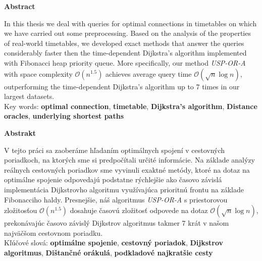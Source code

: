 \documentclass[a4paper]{article}
\renewenvironment{abstract}[1]
{
	\Large
	\begin{center}
		\textbf{#1}
	\end{center}
	
	\normalsize
	
	\addtolength{\leftskip}{1in}
	\addtolength{\rightskip}{1in}
	\setlength{\parindent}{0in}
}
{
}
\numberwithin{algorithm}{section}
\numberwithin{figure}{section}
\numberwithin{table}{section}
\numberwithin{equation}{section}
\begin{document}
    \begin{abstract}{Abstract}
        In this thesis we deal with queries for optimal connections in timetables on which we have carried out some preprocessing. Based on the analysis of the properties of real-world timetables, we developed exact methods that answer the queries considerably faster then the time-dependent Dijkstra's algorithm implemented with Fibonacci heap priority queue. More specifically, our method \textit{USP-OR-A} with space complexity $\mathcal{O}(n^{1.5})$ achieves average query time $\mathcal{O}(\sqrt{n} \log n)$, outperforming the time-dependent Dijkstra's algorithm up to 7 times in our largest datasets. \\

		Key words: \textbf{optimal connection}, \textbf{timetable}, \textbf{Dijkstra's algorithm}, \textbf{Distance oracles}, \textbf{underlying shortest paths}
	\end{abstract}	

    \begin{abstract}{Abstrakt}
        V tejto práci sa zaoberáme hľadaním optimálnych spojení v cestovných poriadkoch, na ktorých sme si predpočítali určité informácie. Na základe analýzy reálnych cestovných poriadkov sme vyvinuli exaktné metódy, ktoré na dotaz na optimálne spojenie odpovedajú podstatne rýchlejšie ako časovo závislá implementácia Dijkstrovho algoritmu využívajúca prioritnú frontu na základe Fibonacciho haldy. Presnejšie, náš algoritmus \textit{USP-OR-A} s priestorovou zložitosťou $\mathcal{O}(n^{1.5})$ dosahuje časovú zložitosť odpovede na dotaz $\mathcal{O}(\sqrt{n} \log n)$, prekonávajúc časovo závislý Dijkstrov algoritmus takmer 7 krát v našom najväčšom cestovnom poriadku. \\

		Kľúčové slová: \textbf{optimálne spojenie}, \textbf{cestovný poriadok}, \textbf{Dijkstrov algoritmus}, \textbf{Dištančné orákulá}, \textbf{podkladové najkratšie cesty}
	\end{abstract}	
	
    \pagebreak


    \tableofcontents
\end{document}
